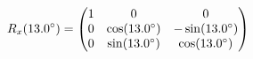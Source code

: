 \documentclass[preview]{standalone}
\begin{document}
\begin{align*}
\special{dvisvgm:raw <g id='unique000'>}R_x(13.0^\circ) = \begin{pmatrix} 1 & 0 & 0 \\ 0 & \cos(13.0^\circ) & -\sin(13.0^\circ) \\ 0 & \sin(13.0^\circ) & \cos(13.0^\circ) \end{pmatrix}\special{dvisvgm:raw </g>}
\end{align*}
\end{document}
